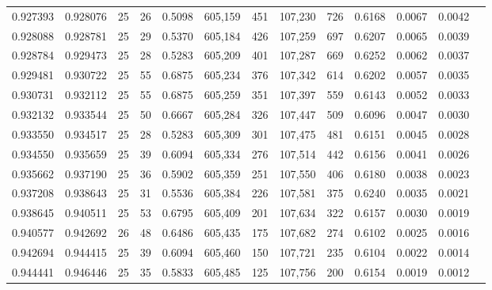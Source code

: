 \begin{tabular}{rrrrrrrrrrrrr}
0.927393 & 0.928076 &    25 &  26 &                                     0.5098 & 605,159 &     451 & 107,230 &     726 & 0.6168 & 0.0067 & 0.0042 \\
0.928088 & 0.928781 &    25 &  29 &                                     0.5370 & 605,184 &     426 & 107,259 &     697 & 0.6207 & 0.0065 & 0.0039 \\
0.928784 & 0.929473 &    25 &  28 &                                     0.5283 & 605,209 &     401 & 107,287 &     669 & 0.6252 & 0.0062 & 0.0037 \\
0.929481 & 0.930722 &    25 &  55 &                                     0.6875 & 605,234 &     376 & 107,342 &     614 & 0.6202 & 0.0057 & 0.0035 \\
0.930731 & 0.932112 &    25 &  55 &                                     0.6875 & 605,259 &     351 & 107,397 &     559 & 0.6143 & 0.0052 & 0.0033 \\
0.932132 & 0.933544 &    25 &  50 &                                     0.6667 & 605,284 &     326 & 107,447 &     509 & 0.6096 & 0.0047 & 0.0030 \\
0.933550 & 0.934517 &    25 &  28 &                                     0.5283 & 605,309 &     301 & 107,475 &     481 & 0.6151 & 0.0045 & 0.0028 \\
0.934550 & 0.935659 &    25 &  39 &                                     0.6094 & 605,334 &     276 & 107,514 &     442 & 0.6156 & 0.0041 & 0.0026 \\
0.935662 & 0.937190 &    25 &  36 &                                     0.5902 & 605,359 &     251 & 107,550 &     406 & 0.6180 & 0.0038 & 0.0023 \\
0.937208 & 0.938643 &    25 &  31 &                                     0.5536 & 605,384 &     226 & 107,581 &     375 & 0.6240 & 0.0035 & 0.0021 \\
0.938645 & 0.940511 &    25 &  53 &                                     0.6795 & 605,409 &     201 & 107,634 &     322 & 0.6157 & 0.0030 & 0.0019 \\
0.940577 & 0.942692 &    26 &  48 &                                     0.6486 & 605,435 &     175 & 107,682 &     274 & 0.6102 & 0.0025 & 0.0016 \\
0.942694 & 0.944415 &    25 &  39 &                                     0.6094 & 605,460 &     150 & 107,721 &     235 & 0.6104 & 0.0022 & 0.0014 \\
0.944441 & 0.946446 &    25 &  35 &                                     0.5833 & 605,485 &     125 & 107,756 &     200 & 0.6154 & 0.0019 & 0.0012 \\

\end{tabular}
